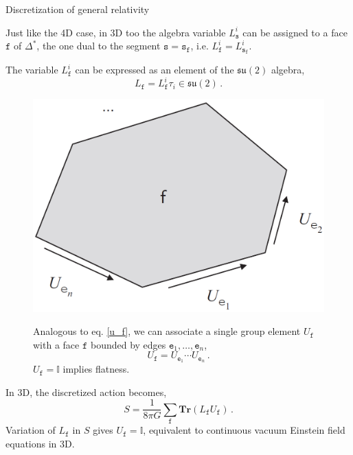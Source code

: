 \documentclass[12pt,titlepage]{article}
\begin{document}
\begin{frame}{Discretization of general relativity}
    \begin{list}{\,}{\leftmargin=1em \itemindent=0em}
        \item<1-> Just like the 4D case, in 3D too the algebra variable $L_\mathtt{s}^i$ can be assigned to a face $\mathtt{f}$ of $\Delta^\text{*}$, the one dual to the segment $\mathtt{s}=\mathtt{s_f}$, i.e. $L_\mathtt{f}^i=L_\mathtt{s_f}^i$.
        \item<2-> The variable $L_\mathtt{f}^i$ can be expressed as an element of the $\mathfrak{su}(2)$ algebra,
        \begin{equation}
            L_\mathtt{f}=L_\mathtt{f}^i \tau_i \in\mathfrak{su}(2)\,.
        \end{equation}
        \item<3-> \noindent\FloatBarrier
        \begin{figure}[!ht]
            \begin{minipage}{0.35\linewidth}
                \includegraphics[width=\linewidth]{4.10}
            \end{minipage}
            \begin{minipage}{0.65\linewidth}
                Analogous to eq. \ref{u_f}, we can associate a single group element $U_\mathtt{f}$ with a face $\mathtt{f}$ bounded by edges $\mathtt{e}_1,\dots,\mathtt{e}_n$,
                \begin{equation}
                    U_\mathtt{f}=U_{\mathtt{e}_1}\cdots U_{\mathtt{e}_n}\,.
                \end{equation}
                $U_\mathtt{f}=\mathbb{I}$ implies flatness.
            \end{minipage}
        \end{figure}\FloatBarrier
        \item<4-> In 3D, the discretized action becomes,
        \begin{equation}
            S=\frac{1}{8\pi G}\sum_\mathtt{f} \mathbf{Tr}(L_\mathtt{f} U_\mathtt{f})\,.
        \end{equation}
        Variation of $L_\mathtt{f}$ in $S$ gives $U_\mathtt{f}=\mathbb{I}$, equivalent to continuous vacuum Einstein field equations in 3D.
    \end{list}
\end{frame}
\end{document}
